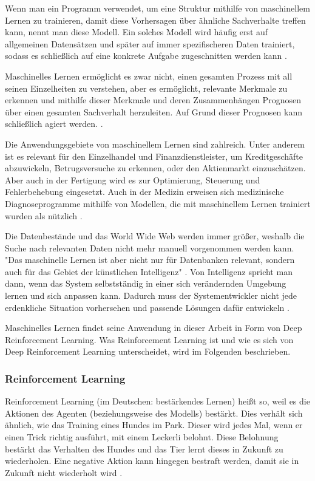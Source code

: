 Wenn man ein Programm verwendet, um eine Struktur mithilfe von maschinellem Lernen zu trainieren, damit diese Vorhersagen über ähnliche Sachverhalte treffen kann, nennt man diese Modell. Ein solches Modell wird häufig erst auf allgemeinen Datensätzen und später auf immer spezifischeren Daten trainiert, sodass es schließlich auf eine konkrete Aufgabe zugeschnitten werden kann \cite[Seite 1f]{alpaydin_maschinelles_2022}.

Maschinelles Lernen ermöglicht es zwar nicht, einen gesamten Prozess mit all seinen Einzelheiten zu verstehen, aber es ermöglicht, relevante Merkmale zu erkennen und mithilfe dieser Merkmale und deren Zusammenhängen Prognosen über einen gesamten Sachverhalt herzuleiten. Auf Grund dieser Prognosen kann schließlich agiert werden. \cite[Seite 2]{alpaydin_maschinelles_2022}.

Die Anwendungsgebiete von maschinellem Lernen sind zahlreich. Unter anderem ist es relevant für den Einzelhandel und Finanzdienstleister, um Kreditgeschäfte abzuwickeln, Betrugsversuche zu erkennen, oder den Aktienmarkt einzuschätzen. Aber auch in der Fertigung wird es zur Optimierung, Steuerung und Fehlerbehebung eingesetzt. Auch in der Medizin erweisen sich medizinische Diagnoseprogramme mithilfe von Modellen, die mit maschinellem Lernen trainiert wurden als nützlich \cite[Seite 3]{alpaydin_maschinelles_2022}.

Die Datenbestände und das World Wide Web werden immer größer, weshalb die Suche nach relevanten Daten nicht mehr manuell vorgenommen werden kann. "Das maschinelle Lernen ist aber nicht nur für Datenbanken relevant, sondern auch für das Gebiet der künstlichen Intelligenz" \cite[Seite 3]{alpaydin_maschinelles_2022}. Von Intelligenz spricht man dann, wenn das System selbstständig in einer sich verändernden Umgebung lernen und sich anpassen kann. Dadurch muss der Systementwickler nicht jede erdenkliche Situation vorhersehen und passende Lösungen dafür entwickeln \cite[Seite 3]{alpaydin_maschinelles_2022}.
 
Maschinelles Lernen findet seine Anwendung in dieser Arbeit in Form von Deep Reinforcement Learning. Was Reinforcement Learning ist und wie es sich von Deep Reinforcement Learning unterscheidet, wird im Folgenden beschrieben.
\subsubsection{Reinforcement Learning}
Reinforcement Learning (im Deutschen: bestärkendes Lernen) heißt so, weil es die Aktionen des Agenten (beziehungsweise des Modells) bestärkt. Dies verhält sich ähnlich, wie das Training eines Hundes im Park. Dieser wird jedes Mal, wenn er einen Trick richtig ausführt, mit einem Leckerli belohnt. Diese Belohnung bestärkt das Verhalten des Hundes und das Tier lernt dieses in Zukunft zu wiederholen. Eine negative Aktion kann hingegen bestraft werden, damit sie in Zukunft nicht wiederholt wird \cite[Seite 11]{ris-ala_fundamentals_2023}.

